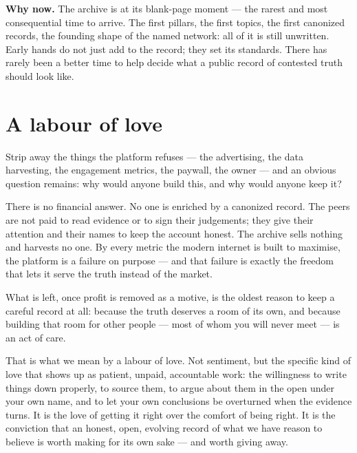 \documentclass[11pt,a4paper]{article}
\begin{document}
\begin{notebox}
\textbf{Why now.} The archive is at its blank-page moment --- the rarest and
most consequential time to arrive. The first pillars, the first topics, the
first canonized records, the founding shape of the named network: all of it
is still unwritten. Early hands do not just add to the record; they set its
standards. There has rarely been a better time to help decide what a public
record of contested truth should look like.
\end{notebox}

\section{A labour of love}

Strip away the things the platform refuses --- the advertising, the data
harvesting, the engagement metrics, the paywall, the owner --- and an obvious
question remains: why would anyone build this, and why would anyone keep it?

There is no financial answer. No one is enriched by a canonized record. The
peers are not paid to read evidence or to sign their judgements; they give
their attention and their names to keep the account honest. The archive
sells nothing and harvests no one. By every metric the modern internet is
built to maximise, the platform is a failure on purpose --- and that failure
is exactly the freedom that lets it serve the truth instead of the market.

What is left, once profit is removed as a motive, is the oldest reason to
keep a careful record at all: because the truth deserves a room of its own,
and because building that room for other people --- most of whom you will
never meet --- is an act of care.

That is what we mean by a labour of love. Not sentiment, but the specific
kind of love that shows up as patient, unpaid, accountable work: the
willingness to write things down properly, to source them, to argue about
them in the open under your own name, and to let your own conclusions be
overturned when the evidence turns. It is the love of getting it right over
the comfort of being right. It is the conviction that an honest, open,
evolving record of what we have reason to believe is worth making for its
own sake --- and worth giving away.
\end{document}
